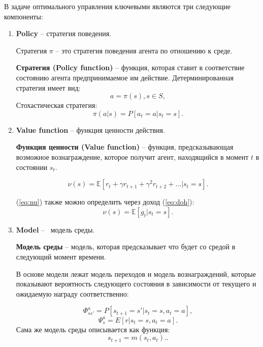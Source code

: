 В задаче оптимального управления ключевыми являются три следующие компоненты: 
\begin{enumerate}
    \item \textbf{Policy}  -- стратегия поведения.
    
    Стратегия $\pi$ -- это стратегия поведения агента по отношению к среде. 
    
    \textbf{Стратегия (Policy function) } – функция, которая ставит в соответствие состоянию агента предпринимаемое им действие. 
    Детерминированная стратегия имеет вид: 
    $$a = \pi(s), s \in S,$$
    Стохастическая стратегия:
    \begin{equation}
    \pi(a|s) = P[a_t = a| s_t = s].
    \label{eq:pi}
    \end{equation}

	\item \textbf{Value function} -- функция ценности действия.
    
    \textbf{Функция ценности (Value function)} –  функция, предсказывающая возможное вознаграждение, которое получит агент, находящийся в момент $t$ в состоянии $s_t$.
    
    \begin{equation}
    	\nu(s) = \mathbb{E} [ r_t + \gamma r_{t+1} + \gamma^2 r_{t+2} + \dots | s_t = s].
    	\label{eq:nu}
    \end{equation}
    
    (\ref{eq:nu}) также можно определить через доход (\ref{eq:doh}):
    \begin{equation}
    	\nu(s) = \mathbb{E}[g_t | s_t = s].
    	  \label{eq:nu2}
    \end{equation}
    
    \item\textbf{Model} --  модель среды.
    
    \textbf{Модель среды} –  модель, которая предсказывает что будет со средой в следующий момент времени.
    
    В основе модели лежат модель переходов и модель вознаграждений, которые показывают вероятность следующего состояния в зависимости от текущего и ожидаемую награду соответственно:
    
    \begin{equation}
    	\Phi_{ss'}^a = P[s_{t+1} = s'| s_t = s, a_t = a],
    	\label{eq:phi}
    \end{equation}
	\begin{equation}
	\Psi_{s}^a = E[r| s_t = s, a_t = a].
	\label{eq:psi}
	\end{equation}
	Сама же модель среды описывается как функция: 
	\begin{equation}
		s_{t+1} = m(s_t, a_t).
		\label{eq:model}.
	\end{equation}
    
\end{enumerate}



